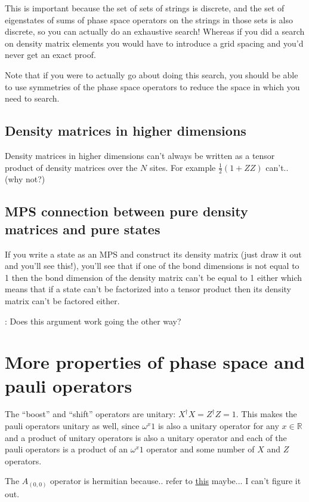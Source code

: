 \documentclass{report}
\begin{document}
 This is important because the set of sets of strings is discrete, and the set of eigenstates of sums of phase space operators on the strings in those sets is also discrete, so you can actually do an exhaustive search! Whereas if you did a search on density matrix elements you would have to introduce a grid spacing and you'd never get an exact proof.
 
 Note that if you were to actually go about doing this search, you should be able to use symmetries of the phase space operators to reduce the space in which you need to search.
 
 \subsection{Density matrices in higher dimensions}
 
 Density matrices in higher dimensions can't always be written as a tensor product of density matrices over the $N$ sites. For example $\frac{1}{2}(1+ZZ)$ can't.. (\todo why not?)
 
 \subsection{MPS connection between pure density matrices and pure states}
 
 If you write a state as an MPS and construct its density matrix (just draw it out and you'll see this!), you'll see that if one of the bond dimensions is not equal to 1 then the bond dimension of the density matrix can't be equal to 1 either which means that if a state can't be factorized into a tensor product then its density matrix can't be factored either.
 
 \todo: Does this argument work going the other way?
 
 \section{More properties of phase space and pauli operators}
 
 The ``boost'' and ``shift'' operators are unitary: $X^\dagger X=Z^\dagger Z=1$. This makes the pauli operators unitary as well, since $\omega^x 1$ is also a unitary operator for any $x\in\mathbb R$ and a product of unitary operators is also a unitary operator and each of the pauli operators is a product of an $\omega^x 1$ operator and some number of $X$ and $Z$ operators. 
 
 The $A_{(0,0)}$ operator is hermitian because.. refer to \href{https://arxiv.org/pdf/quant-ph/0602001.pdf}{this} maybe... I can't figure it out.
\end{document}
